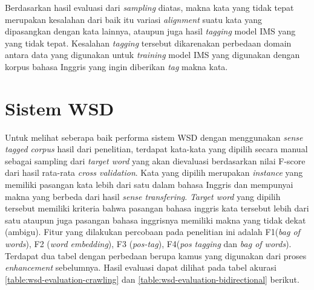 Berdasarkan hasil evaluasi dari \textit{sampling} diatas, makna kata yang tidak tepat merupakan kesalahan dari baik itu variasi \textit{alignment} suatu kata yang dipasangkan dengan kata lainnya, ataupun juga hasil \textit{tagging} model IMS yang yang tidak tepat. Kesalahan \textit{tagging} tersebut dikarenakan perbedaan domain antara data yang digunakan untuk \textit{training} model IMS yang digunakan dengan korpus bahasa Inggris yang ingin diberikan \textit{tag} makna kata. 
\section{Sistem WSD}

Untuk melihat seberapa baik performa sistem WSD dengan menggunakan \textit{sense tagged corpus} hasil dari penelitian, terdapat kata-kata yang dipilih secara manual sebagai sampling dari \textit{target word} yang akan dievaluasi berdasarkan nilai F-score dari hasil rata-rata \textit{cross validation}. Kata yang dipilih merupakan \textit{instance} yang memiliki pasangan kata lebih dari satu dalam bahasa Inggris dan mempunyai makna yang berbeda dari hasil \textit{sense transfering}. \textit{Target word} yang dipilih tersebut memiliki kriteria bahwa pasangan bahasa inggris kata tersebut lebih dari satu ataupun juga pasangan bahasa inggrisnya memiliki makna yang tidak dekat (ambigu). Fitur yang dilakukan percobaan pada penelitian ini adalah F1(\textit{bag of words}), F2 (\textit{word embedding}), F3 (\textit{pos-tag}), F4(\textit{pos tagging} dan \textit{bag of words}). Terdapat dua tabel dengan perbedaan berupa kamus yang digunakan dari proses \textit{enhancement} sebelumnya. Hasil evaluasi dapat dilihat pada tabel akurasi  \ref{table:wsd-evaluation-crawling} dan \ref{table:wsd-evaluation-bidirectional} berikut.


